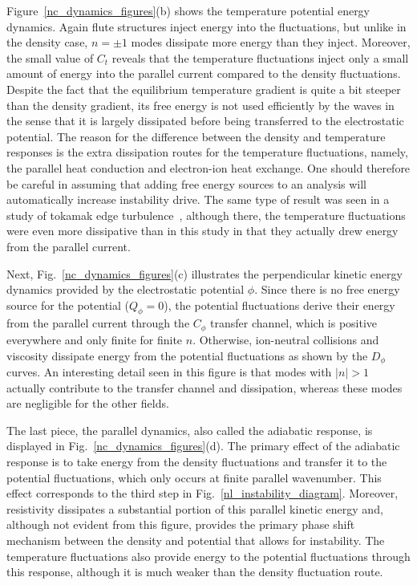 \documentclass[showpacs,preprintnumbers,amsmath,amssymb,superscriptaddress]{revtex4}
\begin{document}
Figure~\ref{nc_dynamics_figures}(b) shows the temperature potential energy dynamics. Again flute structures inject energy into the fluctuations, but unlike in the density case, $n = \pm 1$ modes
dissipate more energy than they inject. Moreover, the small value of $C_t$ reveals that the temperature fluctuations inject only a small amount of energy into the parallel current compared
to the density fluctuations. Despite the fact that the equilibrium temperature gradient is quite a bit steeper than the density gradient, its free energy is not used efficiently by the waves
in the sense that it is largely dissipated before being transferred to the electrostatic potential. The reason for the difference
between the density and temperature responses is the extra dissipation routes for the temperature fluctuations, namely, the parallel heat conduction and electron-ion heat exchange.
One should therefore be careful in assuming that adding free energy sources to an analysis will automatically increase instability drive.
The same type of result was seen in a study of tokamak edge turbulence~\cite{zeiler1997}, although there, the temperature fluctuations were even more dissipative than in this study in that they
actually drew energy from the parallel current. 


Next, Fig.~\ref{nc_dynamics_figures}(c) illustrates the perpendicular kinetic energy dynamics provided by the electrostatic potential $\phi$. 
Since there is no free energy source for the potential ($Q_\phi=0$),
the potential fluctuations derive their energy from the parallel current through the $C_\phi$ transfer channel, which is positive everywhere and only finite for finite $n$. Otherwise, ion-neutral
collisions and viscosity dissipate energy from the potential fluctuations as shown by the $D_\phi$ curves. An interesting detail seen in this figure is that modes with $|n| > 1$ actually
contribute to the transfer channel and dissipation, whereas these modes are negligible for the other fields. 

The last piece, the parallel dynamics, also called the adiabatic response, is displayed in Fig.~\ref{nc_dynamics_figures}(d). 
The primary effect of the adiabatic response is to take energy from the density
fluctuations and transfer it to the potential fluctuations, which only occurs at finite parallel wavenumber. This effect corresponds to the third step in Fig.~\ref{nl_instability_diagram}.
Moreover, resistivity dissipates a substantial portion of this
parallel kinetic energy and, although not evident from this figure, provides
the primary phase shift mechanism between the density and potential that allows for instability. The temperature fluctuations also provide energy to the potential fluctuations
through this response, although it is much weaker than the density fluctuation route. 
\end{document}
